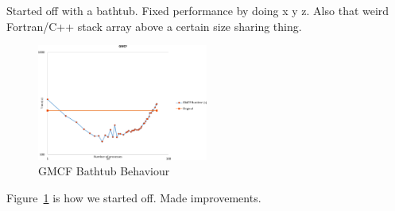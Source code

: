 Started off with a bathtub. Fixed performance by doing x y z. Also that weird
Fortran/C++ stack array above a certain size sharing thing.

\begin{figure}
    \includegraphics[page=1,width=0.5\textwidth]
    {graphs/gmcfBathtub-crop.pdf}
    \caption{GMCF Bathtub Behaviour}
    \label{fig:gmcfbathtub}
\end{figure}

Figure~\ref{fig:gmcfbathtub} is how we started off. Made improvements.
